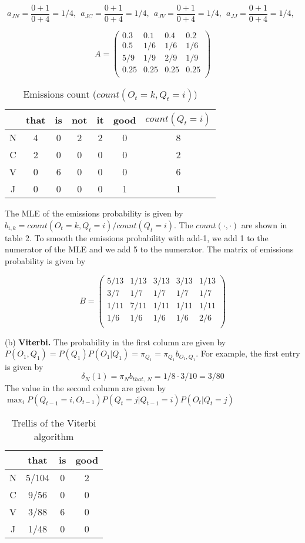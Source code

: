\documentclass[10pt]{article}
\begin{document}
\[
	a_{JN} = \frac{0+1}{0+4}=1/4,~~
	a_{JC} = \frac{0+1}{0+4}=1/4,~~
	a_{JV} = \frac{0+1}{0+4}=1/4,~~
	a_{JJ} = \frac{0+1}{0+4}=1/4,~~
\]


\[
	A = 
	\begin{pmatrix}
		0.3 & 0.1 & 0.4 & 0.2 \\
		0.5 & 1/6 & 1/6 & 1/6 \\
		5/9 & 1/9 & 2/9 & 1/9 \\
		0.25 & 0.25 & 0.25 & 0.25 \\	
	\end{pmatrix}
\]

\begin{table}[h!]
	\centering
	\begin{tabular}{ c|c|c|c|c|c|c }
		& that & is & not &	it & good & $count(Q_t=i)$ \\
		\hline
		N & 4 & 0 & 2 & 2 & 0 & 8 \\
		\hline
		C & 2 & 0 & 0 & 0 & 0 & 2 \\
		\hline
		V & 0 & 6 & 0 & 0 & 0 & 6 \\
		\hline
		J & 0 & 0 & 0 & 0 & 1 & 1 \\
		\hline
	\end{tabular}
	\caption{Emissions count ($count(O_t=k, Q_t=i)$)}
	\label{table:result}
\end{table}

The MLE of the emissions probability is given by $b_{i,k}=count(O_t=k, Q_t=i)/count(Q_t=i)$. The $count(\cdot, \cdot)$ are shown in table 2. To smooth the emissions probability with add-1, we add 1 to the numerator of the MLE and we add 5 to the numerator. The matrix of emissions probability is given by

\[
	B = 
	\begin{pmatrix}
		5/13 & 1/13 & 3/13 & 3/13 & 1/13\\
		3/7 & 1/7 & 1/7 & 1/7 & 1/7 \\
		1/11 & 7/11 & 1/11 & 1/11 & 1/11\\
		1/6 & 1/6 & 1/6 & 1/6 & 2/6 \\
	\end{pmatrix}
\]

(b) \textbf{Viterbi.} The probability in the first column are given by $P(O_1, Q_1)=P(Q_1)P(O_1|Q_1)=\pi_{Q_1}=\pi_{Q_1}b_{O_1, Q_1}$. For example, the first entry is given by
\[
	\delta_N(1) = \pi_N b_{that,~N} = 1/8 \cdot 3/10 = 3/80
\]
The value in the second column are given by $\max_i P(Q_{t-1}=i, O_{t-1}) P(Q_t=j|Q_{t-1}=i)P(O_t|Q_t=j)$
\begin{table}[h!]
	\centering
	\begin{tabular}{ c|c|c|c| }
		& that & is & good  \\
		\hline
		N & 5/104 & 0 & 2 \\
		\hline
		C & 9/56 & 0 & 0 \\
		\hline
		V & 3/88 & 6 & 0 \\
		\hline
		J & 1/48 & 0 & 0 \\
		\hline
	\end{tabular}
	\caption{Trellis of the Viterbi algorithm}
	\label{table:result}
\end{table}
\end{document}
